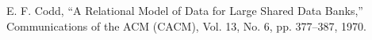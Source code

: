 \documentclass[a4paper,12pt,oneside,openany,autodetect-engine,dvipdfmx,platex]{jsreport}
\begin{document}






\vspace{2em}

\begin{thebibliography}{99}
  E. F. Codd,
  ``A Relational Model of Data for Large Shared Data Banks,''
  Communications of the {ACM} (CACM), Vol. 13, No. 6, pp. 377--387, 1970.
\end{thebibliography}



\end{document}
